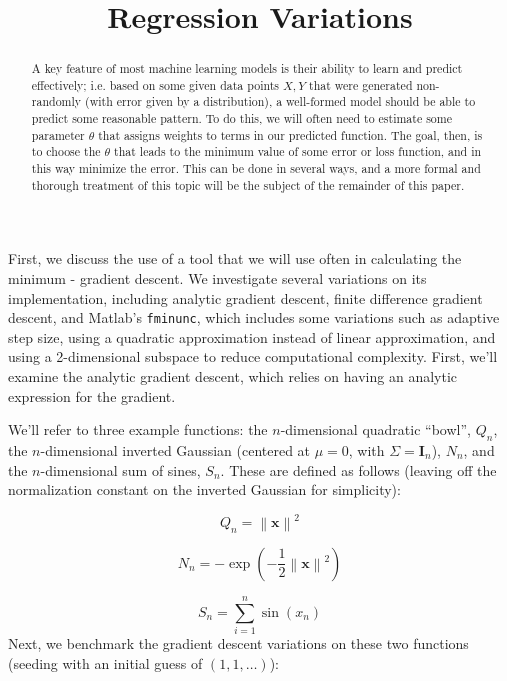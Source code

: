 \documentclass[11pt,letterpaper]{article}
\title{\vspace{-4ex}Regression Variations\vspace{-3.5ex}}
\begin{document}
\maketitle
\vspace{-0.5em}
\begin{abstract}
A key feature of most machine learning models is their ability to learn and predict effectively; i.e. based on some given data points $X, Y$ that were generated non-randomly (with error given by a distribution), a well-formed model should be able to predict some reasonable pattern. To do this, we will often need to estimate some parameter $\theta$ that assigns weights to terms in our predicted function. The goal, then, is to choose the $\theta$ that leads to the minimum value of some error or loss function, and in this way minimize the error. This can be done in several ways, and a more formal and thorough treatment of this topic will be the subject of the remainder of this paper.\\
\end{abstract}

First, we discuss the use of a tool that we will use often in calculating the minimum - gradient descent. We investigate several variations on its implementation, including analytic gradient descent, finite difference gradient descent, and Matlab's \texttt{fminunc}, which includes some variations such as adaptive step size, using a quadratic approximation instead of linear approximation, and using a 2-dimensional subspace to reduce computational complexity. First, we'll examine the analytic gradient descent, which relies on having an analytic expression for the gradient.

We'll refer to three example functions: the $n$-dimensional quadratic ``bowl'', $Q_n$, the $n$-dimensional inverted Gaussian (centered at $\mu = 0$, with $\Sigma = \mathbf I_n$), $N_n$, and the $n$-dimensional sum of sines, $S_n$. These are defined as follows (leaving off the normalization constant on the inverted Gaussian for simplicity):

\[ Q_n = \left\| \mathbf x \right\| ^2 \]

\[ N_n = -\exp{\left(-\dfrac{1}{2} \left\| \mathbf x \right\| ^2 \right)} \]

\[ S_n = \sum_{i=1}^n \sin(x_n) \]
Next, we benchmark the gradient descent variations on these two functions (seeding with an initial guess of $(1,1,\ldots)$):
\end{document}
